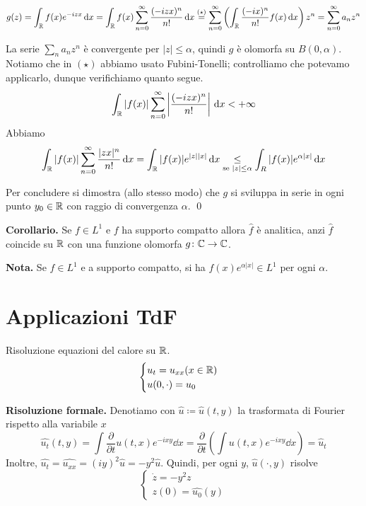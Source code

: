 %
$$
	g(z) = \int_\mathbb R f(x) e^{-izx} \,\mathrm{d} x 
	= \int_\mathbb R f(x) \sum_{n=0}^\infty \frac{(-izx)^n}{n!} \,\mathrm{d} x
	\overset{(\star)}{=} \sum_{n=0}^{\infty} \left( \int_\mathbb R \frac{(-ix)^n}{n!} f(x) \,\mathrm{d} x \right) z^n
	= \sum_{n=0}^\infty a_n z^n
$$
%

La serie $\sum_n a_n z^n$ è convergente per $|z| \leq \alpha$, quindi $g$ è olomorfa su $B(0,\alpha)$.
Notiamo che in $(\star)$ abbiamo usato Fubini-Tonelli; controlliamo che potevamo applicarlo, dunque verifichiamo quanto segue.
%
$$
	\int_{\mathbb R} |f(x)| \sum_{n=0}^{\infty} \left| \frac{(-izx)^n}{n!} \right| \,\mathrm{d} x < + \infty
$$
%
Abbiamo
%
$$
	\int_\mathbb R |f(x)| \sum_{n=0}^{\infty} \frac{|zx|^n}{n!} \,\mathrm{d} x
	= \int_\mathbb R |f(x)| e^{|z| |x|} \,\mathrm{d} x
	\underset{\text{se } |z| \leq \alpha}{\leq} \int_R |f(x)| e^{\alpha |x|} \,\mathrm{d} x
$$
%

Per concludere si dimostra (allo stesso modo) che $g$ si sviluppa in serie in ogni punto $y_0 \in \mathbb R$ con raggio di convergenza $\alpha$.
\qed

\vs


\textbf{Corollario.} Se $f \in L^1$ e $f$ ha supporto compatto allora $\hat{f}$ è analitica, anzi $\hat{f}$ coincide su $\mathbb R$ con una funzione olomorfa $g \colon \mathbb C \to \mathbb C$.

\textbf{Nota.} Se $f \in L^1$ e a supporto compatto, si ha $f(x) e^{\alpha |x|} \in L^1$ per ogni $\alpha$.

\section{Applicazioni TdF}

Risoluzione equazioni del calore su $\mathbb R$.
%
$$
\begin{cases}
u_t = u_{xx} (x \in \mathbb R) \\
u(0,\cdot) = u_0
\end{cases} 
$$
%

\textbf{Risoluzione formale.}
Denotiamo con $\hat{u} \coloneqq \hat{u}(t,y)$ la trasformata di Fourier rispetto alla variabile $x$ 
%
$$
\hat{u_t}(t,y) = \int \frac{\partial}{\partial t} u(t,x) e^{-ixy} \dd x 
	= \frac{\partial}{\partial t} \left( \int u(t,x) e^{-ixy} \dd x \right) = \hat{u}_t
$$
%
Inoltre, $\hat{u_t} = \hat{u_{xx}} = (iy)^2 \hat{u} = -y^2\hat{u}$.
Quindi, per ogni $y$, $\hat{u}(\cdot,y)$ risolve
%
\begin{equation}
\label{eq:09dic_prob1}\tag{P}
\begin{cases}
	\dot z = -y^2 z \\
	z(0) = \hat{u_0}(y)
\end{cases} 
\end{equation}

